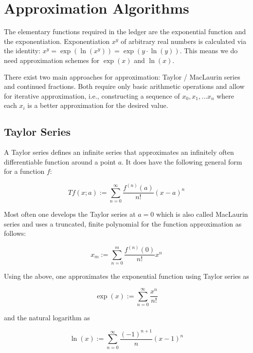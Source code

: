 \documentclass[11pt,a4paper,dvipsnames]{article}
\theoremstyle{definition}
\theoremstyle{definition}
\begin{document}
\section{Approximation Algorithms}
\label{sec:algorithms}

The elementary functions required in the ledger are the exponential function and
the exponentiation. Exponentiation $x^{y}$ of arbitrary real numbers is
calculated via the identity: $x^{y}= \exp({\ln(x^{y})}) = \exp(y\cdot
\ln(y))$. This means we do need approximation schemes for $\exp(x)$ and
$\ln(x)$.

There exist two main approaches for approximation: Taylor / MacLaurin series and
continued fractions. Both require only basic arithmetic operations and allow for
iterative approximation, i.e., constructing a sequence of $x_{0},x_{1},\ldots
x_{n}$ where each $x_{i}$ is a better approximation for the desired value.

\subsection{Taylor Series}
\label{sec:taylor-series}

A Taylor series defines an infinite series that approximates an infinitely often
differentiable function around a point $a$. It does have the following general
form for a function $f$:

\begin{equation*}
  Tf(x; a) := \sum_{n=0}^{\infty}\frac{f^{(n)}(a)}{n!}
  {\left(
    x - a
  \right)}^{n}
\end{equation*}

Most often one develops the Taylor series at $a=0$ which is also called
MacLaurin series and uses a truncated, finite polynomial for the function
approximation as follows:

\begin{equation*}
  x_{m} := \sum_{n=0}^{m}\frac{f^{(n)}(0)}{n!} x^{n}
\end{equation*}

Using the above, one approximates the exponential function using Taylor series
as

\begin{equation*}
  \exp(x) := \sum_{n=0}^{\infty}\frac{x^{n}}{n!}
\end{equation*}

and the natural logarithm as

\begin{equation*}
  \ln(x) := \sum_{n=0}^{\infty}\frac{(-1)^{n+1}}{n}
    {\left(
        x - 1
    \right)}^{n}
\end{equation*}
\end{document}
